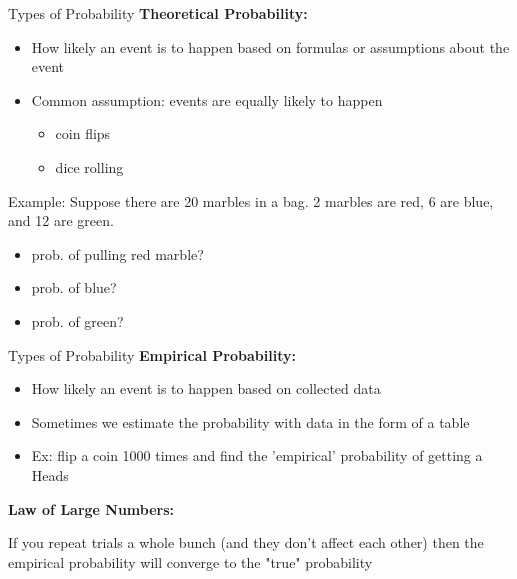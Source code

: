 \documentclass{beamer}
\begin{document}
\begin{frame}{Types of Probability}
\textbf{Theoretical Probability:}
\begin{itemize}
    \item How likely an event is to happen based on formulas or assumptions about the event
    \item Common assumption: events are equally likely to happen
        \begin{itemize}
            \item coin flips
            \item dice rolling
        \end{itemize}
\end{itemize} \vspace{4mm}
Example:
Suppose there are 20 marbles in a bag. 2 marbles are red, 6 are blue, and 12 are green.
\begin{itemize}
    \item prob. of pulling red marble?
    \item prob. of blue?
    \item prob. of green?
\end{itemize}
\end{frame}

\begin{frame}{Types of Probability}
\textbf{Empirical Probability:}
\begin{itemize}
    \item How likely an event is to happen based on collected data
    \item Sometimes we estimate the probability with data in the form of a table
    \item Ex: flip a coin 1000 times and find the 'empirical' probability of getting a Heads
\end{itemize} \vspace{8mm}

\textbf{Law of Large Numbers:}

If you repeat trials a whole bunch (and they don't affect each other) then the empirical probability will converge to the "true" probability
\end{frame}
\end{document}
